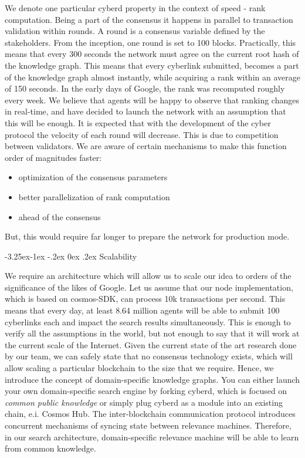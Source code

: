 \documentclass[8pt,oneside]{amsart}
\makeatletter
\newcommand{\linkred}[2]{\href{#1}{\color{red}{#2}}}
\renewcommand\subsection{\@startsection{subsection}{2}{\z@}%
                                     {-3.25ex\@plus -1ex \@minus -.2ex}%
                                     {0ex \@plus .2ex}%
                                     {\play\Large}}%
\newcommand{\titleSection}[1]{\subsection{#1}}
\newcommand{\code}[1]{{\PlayBold #1}}
\makeatother
\begin{document}
\begin{Abstract}
We denote one particular cyberd property in the context of speed - rank computation. Being a part of the consensus it happens in parallel to transaction validation within rounds. A round is a consensus variable defined by the stakeholders. From the inception, one round is set to 100 blocks. Practically, this means that every 300 seconds the network must agree on the current root hash of the knowledge graph. This means that every cyberlink submitted, becomes a part of the knowledge graph almost instantly, while acquiring a rank within an average of 150 seconds. In the early days of Google, the rank was recomputed roughly every week. We believe that agents will be happy to observe that ranking changes in real-time, and have decided to launch the network with an assumption that this will be enough. It is expected that with the development of the cyber protocol the velocity of each round will decrease. This is due to competition between validators. We are aware of certain mechanisms to make this function order of magnitudes faster:
\begin{itemize}
\item optimization of the consensus parameters
\item better parallelization of rank computation
\item \linkred{https://medium.com/solana-labs/proof-of-history-a-clock-for-blockchain-cf47a61a9274}{a better clock} ahead of the consensus
\end{itemize}

But, this would require far longer to prepare the network for production mode.

\titleSection{Scalability}\label{Scalability}

We require an architecture which will allow us to scale our idea to orders of the significance of the likes of Google. Let us assume that our node implementation, which is based on \code{cosmos-SDK}, can process 10k transactions per second. This means that every day, at least 8.64 million agents will be able to submit 100 cyberlinks each and impact the search results simultaneously. This is enough to verify all the assumptions in the world, but not enough to say that it will work at the current scale of the Internet. Given the current state of the art research done by our team, we can safely state that no consensus technology exists, which will allow scaling a particular blockchain to the size that we require. Hence, we introduce the concept of domain-specific knowledge graphs. You can either launch your own domain-specific search engine by forking cyberd, which is focused on \textit{common public knowledge} or simply plug cyberd as a module into an existing chain, e.i. Cosmos Hub. The inter-blockchain communication protocol introduces concurrent mechanisms of syncing state between relevance machines. Therefore, in our search architecture, domain-specific relevance machine will be able to learn from common knowledge.


\end{Abstract}
\end{document}
